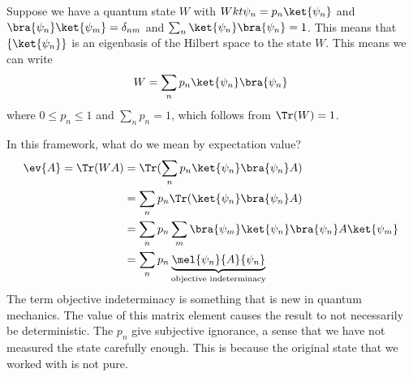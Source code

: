 \documentclass[a4paper,twoside,master.tex]{subfiles}
\begin{document}

\begin{theorem}
    Suppose we have a quantum state $ W $ with $ W kt \psi_n = p_n\ket{\psi_n} $ and $\bra{\psi_n}\ket{\psi_m} = \delta_{nm} $ and $ \sum_n\ket{\psi_n}\bra{\psi_n} = 1 $. This means that $ \{\ket{\psi_n}\} $ is an eigenbasis of the Hilbert space to the state $ W $. This means we can write
    \begin{equation}
        W = \sum_n p_n\ket{\psi_n}\bra{\psi_n}
    \end{equation}
    where $ 0 \leq p_n \leq 1 $ and $ \sum_n p_n = 1 $, which follows from $ \Tr(W) = 1 $.
\end{theorem}

In this framework, what do we mean by expectation value?
\begin{align}
    \ev{A} = \Tr(WA) &= \Tr(\sum_n p_n\ket{\psi_n}\bra{\psi_n} A) \\
    &= \sum_n p_n \Tr(\ket{\psi_n}\bra{\psi_n} A) \\
    &= \sum_n p_n \sum_m\bra{\psi_m}\ket{\psi_n}\bra{\psi_n} A\ket{\psi_m} \\
    &= \sum_n p_n \underbrace{\mel{\psi_n}{A}{\psi_n}}_{\text{objective indeterminacy}}
\end{align}
The term objective indeterminacy is something that is new in quantum mechanics. The value of this matrix element causes the result to not necessarily be deterministic. The $ p_n $ give subjective ignorance, a sense that we have not measured the state carefully enough. This is because the original state that we worked with is not pure.
\end{document}

